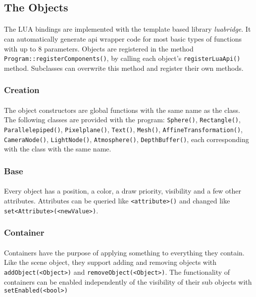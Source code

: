 \subsection{The Objects}
\paragraph{}
The LUA bindings are implemented with the template based library \textit{luabridge}\cite{lb}.
It can automatically generate api wrapper code for most basic types of functions with up to 8 parameters.
Objects are registered in the method \texttt{Program::registerComponents()},
by calling each object's \texttt{registerLuaApi()} method.
Subclasses can overwrite this method and register their own methods.

\subsubsection{Creation}
\paragraph{}
The object constructors are global functions with the same name as the class.
The following classes are provided with the program:
\texttt{Sphere()}, \texttt{Rectangle()}, \texttt{Parallelepiped()}, \texttt{Pixelplane()}, \texttt{Text()}, \texttt{Mesh()}, \texttt{AffineTransformation()}, \texttt{CameraNode()}, \texttt{LightNode()}, \texttt{Atmosphere()}, \texttt{DepthBuffer()}, each corresponding with the class with the same name.

\subsubsection{Base}
\paragraph{}
Every object has a position, a color, a draw priority, visibility and a few other attributes.
Attributes can be queried like \texttt{<attribute>()} and changed like \texttt{set<Attribute>(<newValue>)}.

\subsubsection{Container}
\paragraph{}
Containers have the purpose of applying something to everything they contain.
Like the scene object, they support adding and removing objects with \texttt{addObject(<Object>)} and \texttt{removeObject(<Object>)}.
The functionality of containers can be enabled independently of the visibility of their sub objects with \texttt{setEnabled(<bool>)}

